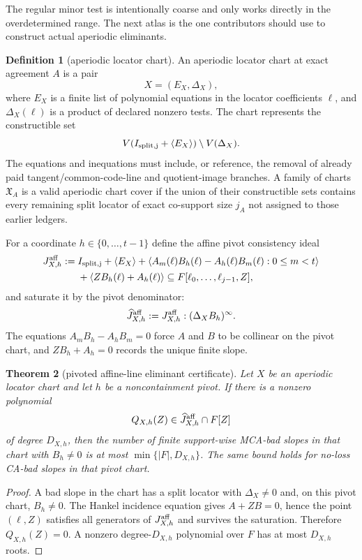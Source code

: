 \documentclass[11pt]{article}
\newtheorem{theorem}{Theorem}[section]
\theoremstyle{definition}
\newtheorem{definition}[theorem]{Definition}
\theoremstyle{remark}
\begin{document}
The regular minor test is intentionally coarse and only works directly in the
overdetermined range.  The next atlas is the one contributors should use to
construct actual aperiodic eliminants.

\begin{definition}[aperiodic locator chart]
\label{def:aperiodic-locator-chart}
An aperiodic locator chart at exact agreement $A$ is a pair
\[
        X=(E_X,\Delta_X),
\]
where $E_X$ is a finite list of polynomial equations in the locator coefficients
$\ell$, and $\Delta_X(\ell)$ is a product of declared nonzero tests.  The chart
represents the constructible set
\[
        V(I_{\rm split,j}+\langle E_X\rangle)\setminus V(\Delta_X).
\]
The equations and inequations must include, or reference, the removal of already
paid tangent/common-code-line and quotient-image branches.  A family of charts
$\mathfrak X_A$ is a valid aperiodic chart cover if the union of their
constructible sets contains every remaining split locator of exact co-support
size $j_A$ not assigned to those earlier ledgers.
\end{definition}

For a coordinate $h\in\{0,\ldots,t-1\}$ define the affine pivot consistency ideal
\[
\begin{aligned}
        J^{\rm aff}_{X,h}:={}&
        I_{\rm split,j}+\langle E_X\rangle
        +\langle A_m(\ell)B_h(\ell)-A_h(\ell)B_m(\ell):0\le m<t\rangle \\
        &+\langle ZB_h(\ell)+A_h(\ell)\rangle
        \subseteq F[\ell_0,\ldots,\ell_{j-1},Z],
\end{aligned}
\]
and saturate it by the pivot denominator:
\[
        \widehat J^{\rm aff}_{X,h}:=
        J^{\rm aff}_{X,h}:(\Delta_X B_h)^\infty .
\]
The equations $A_mB_h-A_hB_m=0$ force $A$ and $B$ to be collinear on the pivot
chart, and $ZB_h+A_h=0$ records the unique finite slope.

\begin{theorem}[pivoted affine-line eliminant certificate]
\label{thm:aperiodic-affine-eliminant}
Let $X$ be an aperiodic locator chart and let $h$ be a noncontainment pivot.  If
there is a nonzero polynomial
\[
        Q_{X,h}(Z)\in \widehat J^{\rm aff}_{X,h}\cap F[Z]
\]
of degree $D_{X,h}$, then the number of finite support-wise MCA-bad slopes in
that chart with $B_h\ne0$ is at most $\min\{|F|,D_{X,h}\}$.  The same bound holds
for no-loss CA-bad slopes in that pivot chart.
\end{theorem}

\begin{proof}
A bad slope in the chart has a split locator with $\Delta_X\ne0$ and, on this
pivot chart, $B_h\ne0$.  The Hankel incidence equation gives
$A+ZB=0$, hence the point $(\ell,Z)$ satisfies all generators of
$J^{\rm aff}_{X,h}$ and survives the saturation.  Therefore $Q_{X,h}(Z)=0$.
A nonzero degree-$D_{X,h}$ polynomial over $F$ has at most $D_{X,h}$ roots.
\end{proof}
\end{document}

